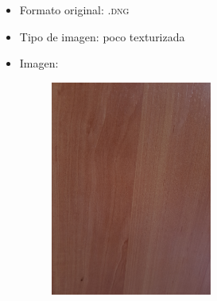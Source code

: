 \documentclass[11pt,a4paper]{article}
\begin{document}
\begin{itemize}
	\item Formato original: \textsc{.dng}
	\item Tipo de imagen: poco texturizada
	\item Imagen:
		\begin{figure}[H]
		\centering
			\includegraphics[width=0.5\textwidth]{Fotos/pocas_texturas.jpg}
		\end{figure}	
\end{itemize}
\end{document}
